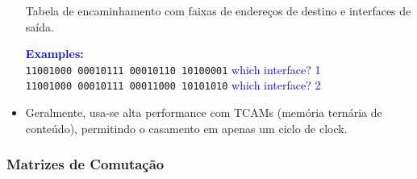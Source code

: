 \begin{itemize}[left=0.5cm, align=left, nosep]
\begin{table}[h!]
                    \caption{Tabela de encaminhamento com faixas de endereços de destino e interfaces de saída.}
                \end{table} 

                \textbf{\textcolor{blue}{Examples:}} \\[2pt]
                \texttt{11001000 00010111 00010110 10100001} \quad \textcolor{blue}{which interface? 1 } \\
                \texttt{11001000 00010111 00011000 10101010} \quad \textcolor{blue}{which interface? 2 }

                \item Geralmente, usa-se alta performance com TCAMs (memória ternária de conteúdo), permitindo o casamento em apenas um ciclo de clock.

            \end{itemize}

        \subsubsection*{Matrizes de Comutação} 

